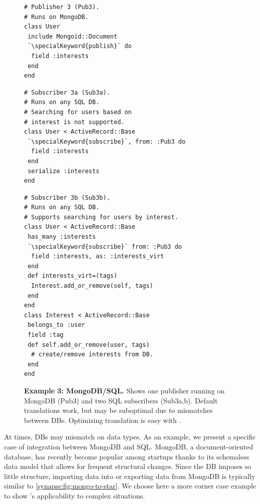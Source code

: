 \begin{figure}
\centering
\begin{minipage}{.45\textwidth}
\begin{lstlisting}[framexleftmargin=5pt]
# Publisher 3 (Pub3).
# Runs on MongoDB.
class User
 include Mongoid::Document
 `\specialKeyword{publish}` do
  field :interests
 end
end
\end{lstlisting}
\begin{lstlisting}[framexleftmargin=5pt]
# Subscriber 3a (Sub3a).
# Runs on any SQL DB.
# Searching for users based on
# interest is not supported.
class User < ActiveRecord::Base
 `\specialKeyword{subscribe}`, from: :Pub3 do
  field :interests
 end
 serialize :interests
end
\end{lstlisting}
\end{minipage}
\hspace{2em}
\begin{minipage}{.45\textwidth}
\begin{lstlisting}[framexleftmargin=5pt]
# Subscriber 3b (Sub3b).
# Runs on any SQL DB.
# Supports searching for users by interest.
class User < ActiveRecord::Base
 has_many :interests
 `\specialKeyword{subscribe}` from: :Pub3 do
  field :interests, as: :interests_virt
 end
 def interests_virt=(tags)
  Interest.add_or_remove(self, tags)
 end
end
class Interest < ActiveRecord::Base
 belongs_to :user
 field :tag
 def self.add_or_remove(user, tags)
  # create/remove interests from DB.
 end
end
\end{lstlisting}
\end{minipage}
\caption{{\bf Example 3: MongoDB/SQL.}
Shows one publisher running on MongoDB (Pub3) and two SQL subscribers
(Sub3a,b).  Default translations work, but may be suboptimal due to
mismatches between DBs.  Optimizing translation is easy with \synapse.
}
\label{synapse:fig:mongo-sql}
\end{figure}

At times, DBs may mismatch on data types.  As an example, we present a specific
case of integration between MongoDB and SQL.
MongoDB, a document-oriented database, has recently become popular among startups
 thanks to its schemaless data model that allows for frequent
structural changes.  Since the DB imposes so little structure, importing data
into or exporting data from MongoDB is typically similar to
\F\ref{synapse:fig:mongo-to-star}.  We choose here a more corner case example to
show \synapse's applicability to complex situations.

